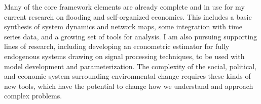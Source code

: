 \documentclass[12pt, oneside]{amsart}
\begin{document}
Many of the core framework elements are already complete and in use for my current research on flooding and self-organized economies. This includes a basic synthesis of system dynamics and network maps, some integration with time series data, and a growing set of tools for analysis. I am also pursuing supporting lines of research, including developing an econometric estimator for fully endogenous systems drawing on signal processing techniques, to be used with model development and parameterization. The complexity of the social, political, and economic system surrounding environmental change requires these kinds of new tools, which have the potential to change how we understand and approach complex problems.

\newpage
{}

\end{document}
